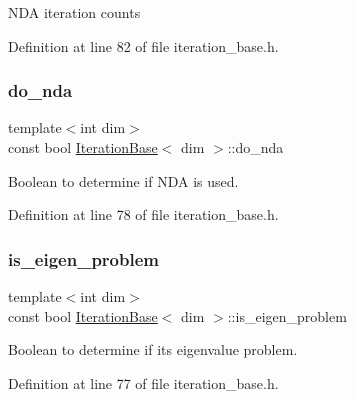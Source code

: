 N\+DA iteration counts 

Definition at line 82 of file iteration\+\_\+base.\+h.

\mbox{\label{class_iteration_base_a871d082ca148eb7976f591f99c2ce81b}} 
\subsubsection{\texorpdfstring{do\+\_\+nda}{do\_nda}}
{\footnotesize\ttfamily template$<$int dim$>$ \\
const bool \hyperlink{class_iteration_base}{Iteration\+Base}$<$ dim $>$\+::do\+\_\+nda\hspace{0.3cm}{\ttfamily [protected]}}



Boolean to determine if N\+DA is used. 



Definition at line 78 of file iteration\+\_\+base.\+h.

\mbox{\label{class_iteration_base_af630d420379811fe33e19c1c8691ad7c}} 
\subsubsection{\texorpdfstring{is\+\_\+eigen\+\_\+problem}{is\_eigen\_problem}}
{\footnotesize\ttfamily template$<$int dim$>$ \\
const bool \hyperlink{class_iteration_base}{Iteration\+Base}$<$ dim $>$\+::is\+\_\+eigen\+\_\+problem\hspace{0.3cm}{\ttfamily [protected]}}



Boolean to determine if it\textquotesingle{}s eigenvalue problem. 



Definition at line 77 of file iteration\+\_\+base.\+h.

\mbox{\label{class_iteration_base_a0c3ec88894828b2bbe3a5ab4fca927ae}} 
